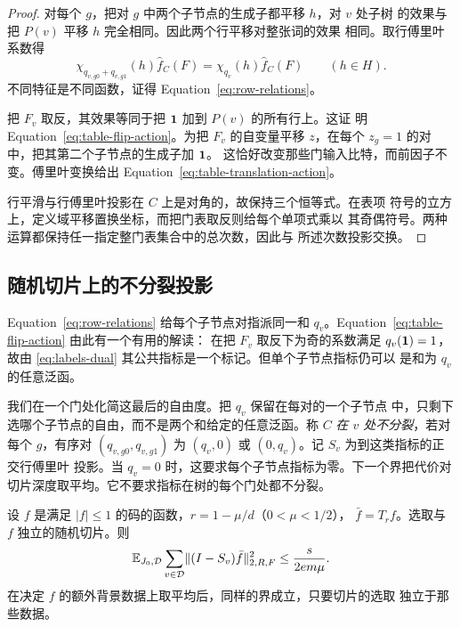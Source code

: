 \begin{proof}
对每个 $g$，把对 $g$ 中两个子节点的生成子都平移 $h$，对 $v$ 处子树
的效果与把 $P(v)$ 平移 $h$ 完全相同。因此两个行平移对整张词的效果
相同。取行傅里叶系数得
\[
 \chi_{q_{v,g0}+q_{v,g1}}(h)\widehat f_C(F)
   =\chi_{q_v}(h)\widehat f_C(F)\qquad(h\in H).
\]
不同特征是不同函数，证得 Equation~\eqref{eq:row-relations}。

把 $F_v$ 取反，其效果等同于把 $\mathbf 1$ 加到 $P(v)$ 的所有行上。这证
明 Equation~\eqref{eq:table-flip-action}。为把 $F_v$ 的自变量平移
$z$，在每个 $z_g=1$ 的对中，把其第二个子节点的生成子加 $\mathbf 1$。
这恰好改变那些门输入比特，而前因子不变。傅里叶变换给出
Equation~\eqref{eq:table-translation-action}。

行平滑与行傅里叶投影在 $C$ 上是对角的，故保持三个恒等式。在表项
符号的立方上，定义域平移置换坐标，而把门表取反则给每个单项式乘以
其奇偶符号。两种运算都保持任一指定整门表集合中的总次数，因此与
所述次数投影交换。
\end{proof}

\subsection{随机切片上的不分裂投影}

Equation~\eqref{eq:row-relations} 给每个子节点对指派同一和
$q_v$。Equation~\eqref{eq:table-flip-action} 由此有一个有用的解读：
在把 $F_v$ 取反下为奇的系数满足 $q_v(\mathbf 1)=1$，故由
\eqref{eq:labels-dual} 其公共指标是一个标记。但单个子节点指标仍可以
是和为 $q_v$ 的任意泛函。

我们在一个门处化简这最后的自由度。把 $q_v$ 保留在每对的一个子节点
中，只剩下选哪个子节点的自由，而不是两个和给定的任意泛函。称 $C$
\emph{在 $v$ 处不分裂}，若对每个 $g$，有序对 $(q_{v,g0},q_{v,g1})$
为 $(q_v,0)$ 或 $(0,q_v)$。记 $S_v$ 为到这类指标的正交行傅里叶
投影。当 $q_v=0$ 时，这要求每个子节点指标为零。下一个界把代价对
切片深度取平均。它不要求指标在树的每个门处都不分裂。

\begin{lemma}[不分裂投影的平均代价]
\label{lem:unsplit}
设 $f$ 是满足 $|f|\le1$ 的码的函数，$r=1-\mu/d$（$0<\mu<1/2$），
$\bar f=T_rf$。选取与 $f$ 独立的随机切片。则
\begin{equation}
 \mathbb E_{J_0,\mathcal D}\sum_{v\in\mathcal D}
       \lVert(I-S_v)\bar f\rVert_{2,R,F}^{2}
       \le \frac{s}{2e m\mu}.
 \label{eq:unsplit-bound}
\end{equation}
在决定 $f$ 的额外背景数据上取平均后，同样的界成立，只要切片的选取
独立于那些数据。
\end{lemma}

